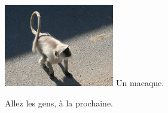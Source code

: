 \begin{multicols}{2}
\hspace*{-0.65cm}
\includegraphics[width=4.8cm]{articles/La-vie-en-inde/singe.jpg}
Un macaque.

Allez les gens, à la prochaine.

\end{multicols}


